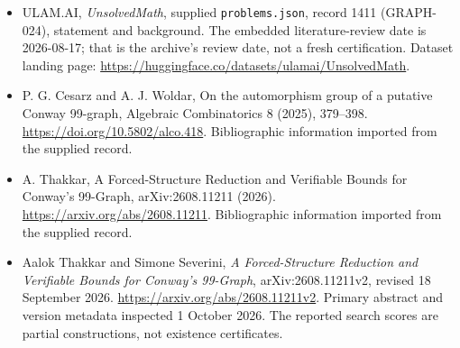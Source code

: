 \documentclass[11pt,a4paper]{article}
\begin{document}
{\small

\begin{itemize}

\item[\hypertarget{source:1411:1}{S1}] ULAM.AI, \emph{UnsolvedMath}, supplied \texttt{problems.json}, record 1411 (GRAPH-024), statement and background. The embedded literature-review date is 2026-08-17; that is the archive’s review date, not a fresh certification. Dataset landing page: \url{https://huggingface.co/datasets/ulamai/UnsolvedMath}.

\item[\hypertarget{source:1411:2}{S2}] P. G. Cesarz and A. J. Woldar, On the automorphism group of a putative Conway 99-graph, Algebraic Combinatorics 8 (2025), 379–398. \url{https://doi.org/10.5802/alco.418}. Bibliographic information imported from the supplied record.

\item[\hypertarget{source:1411:3}{S3}] A. Thakkar, A Forced-Structure Reduction and Verifiable Bounds for Conway's 99-Graph, arXiv:2608.11211 (2026). \url{https://arxiv.org/abs/2608.11211}. Bibliographic information imported from the supplied record.


\item[E1] Aalok Thakkar and Simone Severini,
\emph{A Forced-Structure Reduction and Verifiable Bounds for Conway's
99-Graph}, arXiv:2608.11211v2, revised 18 September 2026.
\url{https://arxiv.org/abs/2608.11211v2}. Primary abstract and version
metadata inspected 1 October 2026. The reported search scores are
partial constructions, not existence certificates.

\end{itemize}

}

\label{end:1411}
\end{document}
